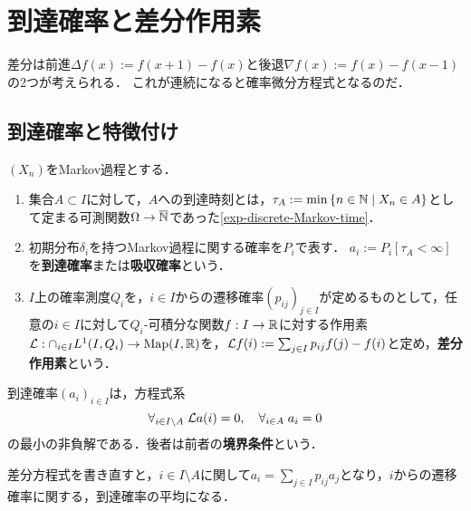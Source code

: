 \documentclass[uplatex,dvipdfmx]{jsreport}
\begin{document}
\section{到達確率と差分作用素}

\begin{tcolorbox}[colframe=ForestGreen, colback=ForestGreen!10!white,breakable,colbacktitle=ForestGreen!40!white,coltitle=black,fonttitle=\bfseries\sffamily,
title=]
    差分は前進$\Delta f(x):=f(x+1)-f(x)$と後退$\nabla f(x):=f(x)-f(x-1)$の2つが考えられる．
    これが連続になると確率微分方程式となるのだ．
\end{tcolorbox}

\subsection{到達確率と特徴付け}

\begin{definition}
    $(X_n)$をMarkov過程とする．
    \begin{enumerate}
        \item 集合$A\subset I$に対して，$A$への到達時刻とは，$\tau_A:=\min\left\{n\in\mathbb{N}\mid X_n\in A\right\}$として定まる可測関数$\Omega\to\overline{\mathbb{N}}$であった\ref{exp-discrete-Markov-time}．
        \item 初期分布$\delta_i$を持つMarkov過程に関する確率を$P_i$で表す．
        $a_i:=P_i[\tau_A<\infty]$を\textbf{到達確率}または\textbf{吸収確率}という．
        \item $I$上の確率測度$Q_i$を，$i\in I$からの遷移確率$(p_{ij})_{j\in I}$が定めるものとして，任意の$i\in I$に対して$Q_i$-可積分な関数$f:I\to\mathbb{R}$に対する作用素
        $\mathcal{L}:\cap_{i\in I}L^1(I,Q_i)\to\mathrm{Map}(I,\mathbb{R})$を，$\mathcal{L} f(i):=\sum_{j\in I}p_{ij}f(j)-f(i)$と定め，\textbf{差分作用素}という．
    \end{enumerate}
\end{definition}

\begin{theorem}[到達確率の特徴付け]
    到達確率$(a_i)_{i\in I}$は，方程式系
    \[\forall_{i\in I\setminus A}\;\mathcal{L} a(i)=0,\quad\forall_{i\in A}\;a_i=0\]
    の最小の非負解である．後者は前者の\textbf{境界条件}という．
\end{theorem}
\begin{remarks}
    差分方程式を書き直すと，$i\in I\setminus A$に関して$a_i=\sum_{j\in I}p_{ij}a_j$となり，$i$からの遷移確率に関する，到達確率の平均になる．
\end{remarks}
\end{document}
